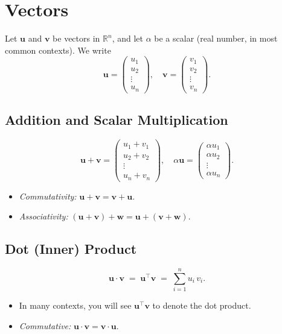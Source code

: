 
\section{Vectors}
Let $\mathbf{u}$ and $\mathbf{v}$ be vectors in $\mathbb{R}^n$, and let $\alpha$ be a scalar 
(real number, in most common contexts). We write
\[
\mathbf{u} =
\begin{pmatrix}
u_1 \\
u_2 \\
\vdots \\
u_n
\end{pmatrix}, 
\quad
\mathbf{v} =
\begin{pmatrix}
v_1 \\
v_2 \\
\vdots \\
v_n
\end{pmatrix}.
\]

\subsection{Addition and Scalar Multiplication}
\[
\mathbf{u} + \mathbf{v} =
\begin{pmatrix}
u_1 + v_1 \\
u_2 + v_2 \\
\vdots \\
u_n + v_n
\end{pmatrix},
\quad
\alpha \mathbf{u} =
\begin{pmatrix}
\alpha u_1 \\
\alpha u_2 \\
\vdots \\
\alpha u_n
\end{pmatrix}.
\]
\begin{itemize}
\item \emph{Commutativity:} $\mathbf{u} + \mathbf{v} = \mathbf{v} + \mathbf{u}$.
\item \emph{Associativity:} $(\mathbf{u} + \mathbf{v}) + \mathbf{w} = \mathbf{u} + (\mathbf{v} + \mathbf{w})$.
\end{itemize}

\subsection{Dot (Inner) Product}
\[
\mathbf{u} \cdot \mathbf{v} \;=\; \mathbf{u}^\top \mathbf{v} \;=\; \sum_{i=1}^n u_i \, v_i.
\]
\begin{itemize}
\item In many contexts, you will see $\mathbf{u}^\top \mathbf{v}$ to denote the dot product.
\item \emph{Commutative:} $\mathbf{u} \cdot \mathbf{v} = \mathbf{v} \cdot \mathbf{u}$.
\end{itemize}

